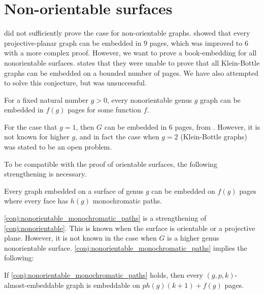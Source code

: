 
\section{Non-orientable surfaces}

\textcite{heathEmbeddingPlanarGraphs1984} did not sufficiently prove the case for non-orientable graphs. \textcite{nakamotoBookEmbeddingProjectiveplanar2015} showed that every projective-planar graph can be embedded in $9$ pages, which was improved to 6 with a more complex proof. However, we want to prove a book-embedding for all nonorientable surfaces. 
\textcite{ozekiBookEmbeddingGraphs2019} states that they were unable to prove that all Klein-Bottle graphs can be embedded on a bounded number of pages. We have also attempted to solve this conjecture, but was unsuccessful. 

\begin{conjecture}\label{conj:nonorientable}
	For a fixed natural number $g > 0$, every nonorientable genus $g$ graph can be embedded in $f(g)$ pages for some function $f$. 
\end{conjecture}

For the case that $g = 1$, then $G$ can be embedded in 6 pages, from \textcite{ozekiBookEmbeddingGraphs2019}. However, it is not known for higher $g$, and in fact the case when $g = 2$ (Klein-Bottle graphs) was stated to be an open problem. 

To be compatible with the proof of orientable surfaces, the following strengthening is necessary. 
\begin{conjecture}\label{conj:nonorientable_monochromatic_paths}
	Every graph embedded on a surface of genus $g$ can be embedded on $f(g)$ pages where every face has $h(g)$ monochromatic paths. 
\end{conjecture}

\cref{conj:nonorientable_monochromatic_paths} is a strengthening of \cref{conj:nonorientable}. This is known when the surface is orientable or a projective plane. However, it is not known in the case when $G$ is a higher genus nonorientable surface.
\cref{conj:nonorientable_monochromatic_paths} implies the following:

\begin{corollary}\label{corr:aegraphs}
	If \cref{conj:nonorientable_monochromatic_paths} holds, then every $(g, p, k)$-almost-embeddable graph is embeddable on $p h(g) (k + 1) + f(g)$ pages.
\end{corollary}


